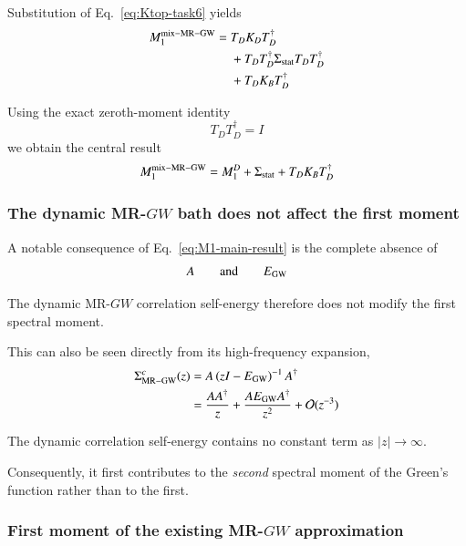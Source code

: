 \documentclass[aip,jcp,reprint,noshowkeys,superscriptaddress]{revtex4-1}
\begin{document}
Substitution of Eq.~\eqref{eq:Ktop-task6} yields
\begin{equation}
  \begin{aligned}
  M_1^{\rm mix-MR-GW}
  ={}&
  T_DK_DT_D^\dagger
  \\
  &+
  T_DT_D^\dagger
  \Sigma_{\rm stat}
  T_DT_D^\dagger
  \\
  &+
  T_DK_BT_D^\dagger
  \end{aligned}
\end{equation}

Using the exact zeroth-moment identity
\begin{equation}
  T_DT_D^\dagger=I
\end{equation}
we obtain the central result
\begin{equation}
  M_1^{\rm mix-MR-GW}
  =
  M_1^D
  +
  \Sigma_{\rm stat}
  +
  T_DK_BT_D^\dagger
  \label{eq:M1-main-result}
\end{equation}


\subsubsection{The dynamic MR-$GW$ bath does not affect the first moment}

A notable consequence of Eq.~\eqref{eq:M1-main-result} is the complete
absence of
\begin{equation}
  A
  \qquad\text{and}\qquad
  E_{\rm GW}
\end{equation}

The dynamic MR-$GW$ correlation self-energy therefore does not modify
the first spectral moment.

This can also be seen directly from its high-frequency expansion,
\begin{equation}
  \begin{aligned}
  \Sigma_{\rm MR-GW}^{c}(z)
  &=
  A
  \left(
    zI-E_{\rm GW}
  \right)^{-1}
  A^\dagger
  \\
  &=
  \frac{
    AA^\dagger
  }{z}
  +
  \frac{
    AE_{\rm GW}A^\dagger
  }{z^2}
  +
  \mathcal O(z^{-3})
  \end{aligned}
  \label{eq:SigmaGW-high-frequency}
\end{equation}

The dynamic correlation self-energy contains no constant term as
$|z|\rightarrow\infty$.

Consequently, it first contributes to the \emph{second} spectral
moment of the Green's function rather than to the first.


\subsubsection{First moment of the existing MR-$GW$ approximation}
\end{document}
